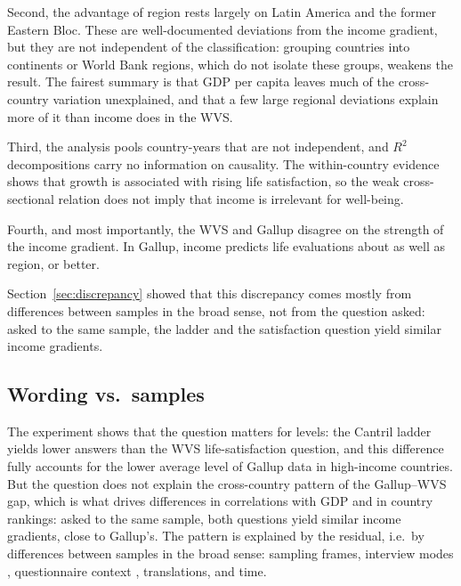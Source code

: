 \documentclass[12pt]{article}
\begin{document}
Second, the advantage of region rests largely on Latin America and the former Eastern Bloc. These are well-documented deviations from the income gradient, but they are not independent of the classification: grouping countries into continents or World Bank regions, which do not isolate these groups, weakens the result. %
The fairest summary is that GDP per capita leaves much of the cross-country variation unexplained, and that a few large regional deviations explain more of it than income does in the WVS.

Third, the analysis pools country-years that are not independent, and $R^2$ decompositions carry no information on causality. The within-country evidence shows that growth is associated with rising life satisfaction, so the weak cross-sectional relation does not imply that income is irrelevant for well-being.

Fourth, and most importantly, the WVS and Gallup disagree on the strength of the income gradient. In Gallup, income predicts life evaluations about as well as region, or better.

Section~\ref{sec:discrepancy} showed that this discrepancy comes mostly from differences between samples in the broad sense, not from the question asked: asked to the same sample, the ladder and the satisfaction question yield similar income gradients.
\subsection{Wording vs.\ samples}
The experiment shows that the question matters for levels: the Cantril ladder yields lower answers than the WVS life-satisfaction question, and this difference fully accounts for the lower average level of Gallup data in high-income countries. But the question does not explain the cross-country pattern of the Gallup--WVS gap, which is what drives differences in correlations with GDP and in country rankings: asked to the same sample, both questions yield similar income gradients, close to Gallup's. The pattern is explained by the residual, i.e.\ by differences between samples in the broad sense: sampling frames, interview modes \citep{dolan_happy_2016,conti_survey_2011}, questionnaire context \citep{deaton_financial_2012,deaton_understanding_2016}, translations, and time.
\end{document}
